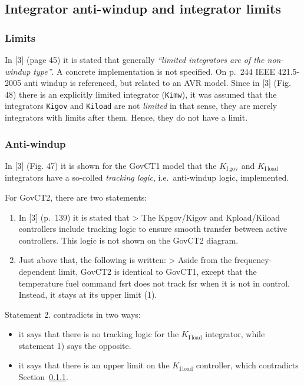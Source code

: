 \documentclass[
  a4paper,
  DIV=11,
  numbers=noendperiod]{scrartcl}
\providecommand{\tightlist}{%
  \setlength{\itemsep}{0pt}\setlength{\parskip}{0pt}}\usepackage{longtable,booktabs,array}
\begin{document}
\subsection{Integrator anti-windup and integrator
limits}\label{integrator-anti-windup-and-integrator-limits}

\subsubsection{Limits}\label{sec-assumptionLimits}

In {[}3{]} (page 45) it is stated that generally \emph{``limited
integrators are of the non-windup type''}. A concrete implementation is
not specified. On p.~244 IEEE 421.5-2005 anti windup is referenced, but
related to an AVR model. Since in {[}3{]} (Fig. 48) there is an
explicitly limited integrator (\texttt{Kimw}), it was assumed that the
integrators \texttt{Kigov} and \texttt{Kiload} are not \emph{limited} in
that sense, they are merely integrators with limits after them. Hence,
they do not have a limit.

\subsubsection{Anti-windup}\label{anti-windup}

In {[}3{]} (Fig. 47) it is shown for the GovCT1 model that the
\(K_\mathrm{I\,gov}\) and \(K_\mathrm{I\,load}\) integrators have a
so-colled \emph{tracking logic}, i.e.~anti-windup logic, implemented.

For GovCT2, there are two statements:

\begin{enumerate}
\def\labelenumi{\arabic{enumi})}
\item
  In {[}3{]} (p.~139) it is stated that \textgreater{} The Kpgov/Kigov
  and Kpload/Kiload controllers include tracking logic to ensure smooth
  transfer between active controllers. This logic is not shown on the
  GovCT2 diagram.
\item
  Just above that, the following is written: \textgreater{} Aside from
  the frequency-dependent limit, GovCT2 is identical to GovCT1, except
  that the temperature fuel command fsrt does not track fsr when it is
  not in control. Instead, it stays at its upper limit (1).
\end{enumerate}

Statement 2. contradicts in two ways:

\begin{itemize}
\tightlist
\item
  it says that there is no tracking logic for the \(K_\mathrm{I\,load}\)
  integrator, while statement 1) says the opposite.
\item
  it says that there is an upper limit on the \(K_\mathrm{I\,load}\)
  controller, which contradicts Section~\ref{sec-assumptionLimits}.
\end{itemize}
\end{document}
